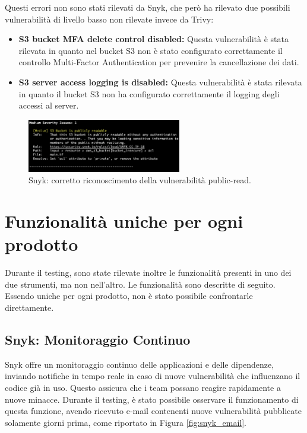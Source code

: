 Questi errori non sono stati rilevati da Snyk, che però ha rilevato due possibili vulnerabilità di livello basso non rilevate invece da Trivy:
\begin{itemize}
   \item \textbf{S3 bucket MFA delete control disabled:} Questa vulnerabilità è stata rilevata in quanto nel bucket S3 non è stato configurato correttamente il controllo Multi-Factor Authentication per prevenire la cancellazione dei dati.
   \item \textbf{S3 server access logging is disabled:} Questa vulnerabilità è stata rilevata in quanto il bucket S3 non ha configurato correttamente il logging degli accessi al server.
\end{itemize}
\begin{figure}[H]
   \centering
   \includegraphics[width=0.6\textwidth]{immagini/capitolo2/snyk_iac.png}
   \caption{Snyk: corretto riconoscimento della vulnerabilità public-read.}
   \label{fig:snyk_iac}
\end{figure}


\section{Funzionalità uniche per ogni prodotto}
Durante il testing, sono state rilevate inoltre le funzionalità presenti in uno dei due strumenti, ma non nell'altro. Le funzionalità sono descritte di seguito. Essendo uniche per ogni prodotto, non è stato possibile confrontarle direttamente.

\subsection{Snyk: Monitoraggio Continuo}
Snyk offre un monitoraggio continuo delle applicazioni e delle dipendenze, inviando notifiche in tempo reale in caso di nuove vulnerabilità che influenzano il codice già in uso. Questo assicura che i team possano reagire rapidamente a nuove minacce. Durante il testing, è stato possibile osservare il funzionamento di questa funzione, avendo ricevuto e-mail contenenti nuove vulnerabilità pubblicate solamente giorni prima, come riportato in Figura \ref{fig:snyk_email}.

